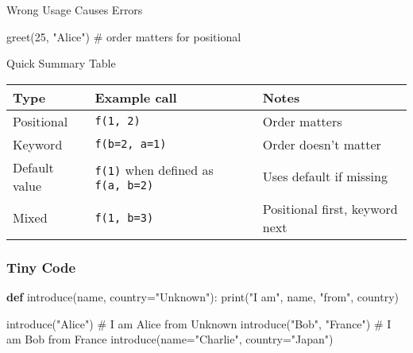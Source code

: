 \documentclass[
  letterpaper,
  DIV=11,
  numbers=noendperiod]{scrreprt}
\newenvironment{Shaded}{\begin{snugshade}}{\end{snugshade}}
\newcommand{\BuiltInTok}[1]{\textcolor[rgb]{0.00,0.23,0.31}{#1}}
\newcommand{\CommentTok}[1]{\textcolor[rgb]{0.37,0.37,0.37}{#1}}
\newcommand{\DecValTok}[1]{\textcolor[rgb]{0.68,0.00,0.00}{#1}}
\newcommand{\KeywordTok}[1]{\textcolor[rgb]{0.00,0.23,0.31}{\textbf{#1}}}
\newcommand{\NormalTok}[1]{\textcolor[rgb]{0.00,0.23,0.31}{#1}}
\newcommand{\OperatorTok}[1]{\textcolor[rgb]{0.37,0.37,0.37}{#1}}
\newcommand{\StringTok}[1]{\textcolor[rgb]{0.13,0.47,0.30}{#1}}
\begin{document}
Wrong Usage Causes Errors

\begin{Shaded}
\begin{Highlighting}[]
\NormalTok{greet(}\DecValTok{25}\NormalTok{, }\StringTok{"Alice"}\NormalTok{)   }\CommentTok{\# order matters for positional}
\end{Highlighting}
\end{Shaded}

Quick Summary Table

\begin{longtable}[]{@{}
  >{\raggedright\arraybackslash}p{}
  >{\raggedright\arraybackslash}p{}
  >{\raggedright\arraybackslash}p{}@{}}
\toprule\noalign{}
\begin{minipage}[b]{\linewidth}\raggedright
Type
\end{minipage} & \begin{minipage}[b]{\linewidth}\raggedright
Example call
\end{minipage} & \begin{minipage}[b]{\linewidth}\raggedright
Notes
\end{minipage} \\
\midrule\noalign{}
\endhead
\bottomrule\noalign{}
\endlastfoot
Positional & \texttt{f(1,\ 2)} & Order matters \\
Keyword & \texttt{f(b=2,\ a=1)} & Order doesn't matter \\
Default value & \texttt{f(1)} when defined as \texttt{f(a,\ b=2)} & Uses
default if missing \\
Mixed & \texttt{f(1,\ b=3)} & Positional first, keyword next \\
\end{longtable}

\subsubsection{Tiny Code}\label{tiny-code-31}

\begin{Shaded}
\begin{Highlighting}[]
\KeywordTok{def}\NormalTok{ introduce(name, country}\OperatorTok{=}\StringTok{"Unknown"}\NormalTok{):}
    \BuiltInTok{print}\NormalTok{(}\StringTok{"I am"}\NormalTok{, name, }\StringTok{"from"}\NormalTok{, country)}

\NormalTok{introduce(}\StringTok{"Alice"}\NormalTok{)                 }\CommentTok{\# I am Alice from Unknown}
\NormalTok{introduce(}\StringTok{"Bob"}\NormalTok{, }\StringTok{"France"}\NormalTok{)         }\CommentTok{\# I am Bob from France}
\NormalTok{introduce(name}\OperatorTok{=}\StringTok{"Charlie"}\NormalTok{, country}\OperatorTok{=}\StringTok{"Japan"}\NormalTok{)}
\end{Highlighting}
\end{Shaded}
\end{document}
